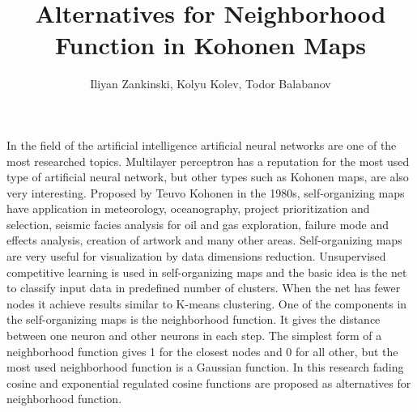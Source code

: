 \documentclass[12pt,a4paper]{article}
\title{Alternatives for Neighborhood Function in Kohonen Maps}
\author{Iliyan Zankinski, Kolyu Kolev, Todor Balabanov}
\date{\empty}
\begin{document}
 
\maketitle

In the field of the artificial intelligence artificial neural networks are one of the most researched topics. Multilayer perceptron has a reputation for the most used type of artificial neural network, but other types such as Kohonen maps, are also very interesting. Proposed by Teuvo Kohonen in the 1980s, self-organizing maps have application in meteorology, oceanography, project prioritization and selection, seismic facies analysis for oil and gas exploration, failure mode and effects analysis, creation of artwork and many other areas. Self-organizing maps are very useful for visualization by data dimensions reduction. Unsupervised competitive learning is used in self-organizing maps and the basic idea is the net to classify input data in predefined number of clusters. When the net has fewer nodes it achieve results similar to K-means clustering. One of the components in the self-organizing maps is the neighborhood function. It gives the distance between one neuron and other neurons in each step. The simplest form of a neighborhood function gives 1 for the closest nodes and 0 for all other, but the most used neighborhood function is a Gaussian function. In this research fading cosine and exponential regulated cosine functions are proposed as alternatives for neighborhood function.
\end{document}
